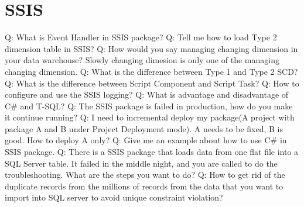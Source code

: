 \documentclass[a4paper,11pt]{article}
\begin{document}
\section{SSIS}
Q: What is Event Handler in SSIS package? \newline \newline
\noindent 
Q: Tell me how to load Type 2 dimension table in SSIS? \newline \newline
\noindent 
Q: How would you say managing changing dimension in your data warehouse? Slowly changing dimesion is only one of the managing changing dimension.\newline \newline
\noindent 
Q: What is the difference between Type 1 and Type 2 SCD? \newline \newline
\noindent 
Q: What is the difference between Script Component and Script Task? \newline \newline
\noindent 
Q: How to configure and use the SSIS logging? \newline \newline
\noindent 
Q: What is advantage and disadvantage of C\# and T-SQL? \newline \newline
\noindent 
Q: The SSIS package is failed in production, how do you make it continue running? \newline \newline
\noindent 
Q: I need to incremental deploy my package(A project with package A and B under Project Deployment mode). A needs to be fixed, B is good. How to deploy A only? \newline \newline
\noindent 
Q: Give me an example about how to use C\# in SSIS package. \newline \newline
\noindent 
Q: There is a SSIS package that loads data from one flat file into a SQL Server table. It failed in the middle night, and you are called to do the troubleshooting. What are the steps you want to do? \newline \newline
\noindent 
Q: How to get rid of the duplicate records from the millions of records from the data that you want to import into SQL server to avoid unique constraint violation? \newline \newline
\end{document}
